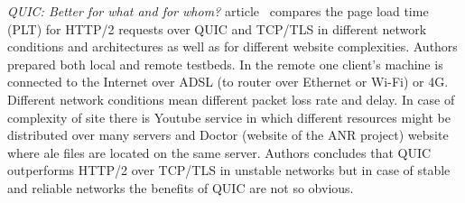 \textit{QUIC: Better for what and for whom?} article~\cite{quic-better-for-what-and-for-whom} compares the page load time (PLT) for HTTP/2 requests over QUIC and TCP/TLS in different network conditions and architectures as well as for different website complexities.
Authors prepared both local and remote testbeds.
In the remote one client's machine is connected to the Internet over ADSL (to router over Ethernet or Wi-Fi) or 4G\@.
Different network conditions mean different packet loss rate and delay.
In case of complexity of site there is Youtube service in which different resources might be distributed over many servers and Doctor (website of the ANR project) website where ale files are located on the same server.
Authors concludes that QUIC outperforms HTTP/2 over TCP/TLS in unstable networks but in case of stable and reliable networks the benefits of QUIC are not so obvious.

